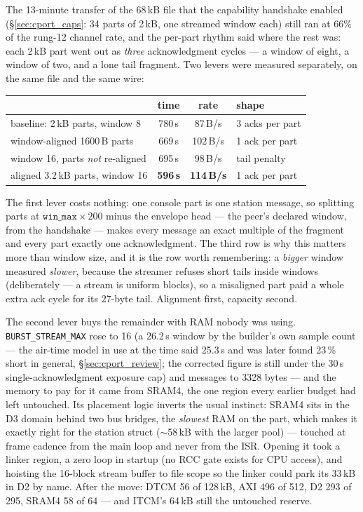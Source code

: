 The 13-minute transfer of the 68\,kB file that the capability
handshake enabled (\S\ref{sec:cport_caps}: 34 parts of 2\,kB, one
streamed window each) still ran at 66\% of the rung-12 channel rate,
and the per-part rhythm said where the rest was: each 2\,kB part went
out as \emph{three} acknowledgment cycles --- a window of eight, a
window of two, and a lone tail fragment. Two levers were measured
separately, on the same file and the same wire:

\begin{center}
\begin{tabular}{lccl}
\hline
 & time & rate & shape \\
\hline
baseline: 2\,kB parts, window 8 & 780\,s & 87\,B/s & 3 acks per part \\
window-aligned 1600\,B parts & 669\,s & 102\,B/s & 1 ack per part \\
window 16, parts \emph{not} re-aligned & 695\,s & 98\,B/s & tail penalty \\
aligned 3.2\,kB parts, window 16 & \textbf{596\,s} & \textbf{114\,B/s} & 1 ack per part \\
\hline
\end{tabular}
\end{center}

The first lever costs nothing: one console part is one station
message, so splitting parts at $\mathtt{win\_max} \times 200$ minus
the envelope head --- the peer's declared window, from the handshake
--- makes every message an exact multiple of the fragment and every
part exactly one acknowledgment. The third row is why this matters
more than window size, and it is the row worth remembering: a
\emph{bigger} window measured \emph{slower}, because the streamer
refuses short tails inside windows (deliberately --- a stream is
uniform blocks), so a misaligned part paid a whole extra ack cycle for
its 27-byte tail. Alignment first, capacity second.

The second lever buys the remainder with RAM nobody was using.
\texttt{BURST\_STREAM\_MAX} rose to 16 (a 26.2\,s window by the
builder's own sample count --- the air-time model in use at the time
said 25.3\,s and was later found 23\,\% short in general,
\S\ref{sec:cport_review}; the corrected figure is still under the
30\,s single-acknowledgment exposure cap) and messages to
3328 bytes --- and the memory to pay for it came from SRAM4, the one
region every earlier budget had left untouched. Its placement logic
inverts the usual instinct: SRAM4 sits in the D3 domain behind two bus
bridges, the \emph{slowest} RAM on the part, which makes it exactly
right for the station struct ($\sim$58\,kB with the larger pool) ---
touched at frame cadence from the main loop and never from the ISR.
Opening it took a linker region, a zero loop in startup (no RCC gate
exists for CPU access), and hoisting the 16-block stream buffer to
file scope so the linker could park its 33\,kB in D2 by name. After
the move: DTCM 56 of 128\,kB, AXI 496 of 512, D2 293 of 295, SRAM4 58
of 64 --- and ITCM's 64\,kB still the untouched reserve.

